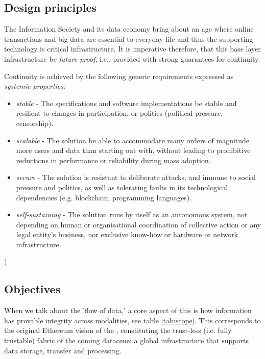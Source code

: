 \subsection{Design principles \statusorange}\label{sec:design-principles}
 

The Information Society and its data economy bring about an age where online transactions and big data are essential to everyday life and thus the supporting technology is critical infrastructure. It is imperative therefore, that this base layer infrastructure be \emph{future proof}, i.e., provided with strong guarantees for continuity. 

Continuity is achieved by the following generic requirements expressed as \emph{systemic properties}:

\begin{itemize}
\item \emph{stable} - The specifications and software implementations be stable and resilient to changes in participation, or politics (political pressure, censorship).
\item \emph{scalable} - The solution be able to accommodate many orders of magnitude more users and data than starting out with, without leading to prohibitive reductions in performance or reliability during mass adoption.  
\item \emph{secure} - The solution is resistant to deliberate attacks, and immune to social pressure and politics, as well as tolerating faults in its technological dependencies (e.g. blockchain, programming languages). 
\item \emph{self-sustaining} - The solution runs by itself as an autonomous system, not depending on human or organisational coordination of collective action or any legal entity's business, nor exclusive know-how or hardware or network infrastructure. 
\end{itemize}
)



\subsection{Objectives \statusyellow}\label{sec:objectives}


When we talk about the 'flow of data,' a core aspect of this is how information has provable integrity across modalities, see table \ref{tab:scope}. This corresponds to the original Ethereum vision of the ,  constituting the trust-less (i.e. fully trustable) fabric of the coming datacene: a global infrastructure that supports data storage, transfer and processing.

